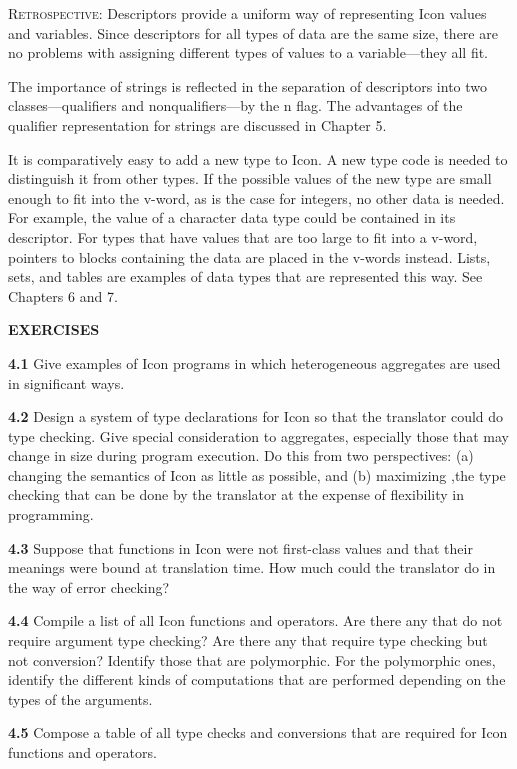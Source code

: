 \textsc{Retrospective}: Descriptors provide a uniform way of
representing Icon values and variables. Since descriptors for all
types of data are the same size, there are no problems with assigning
different types of values to a variable---they all fit.

The importance of strings is reflected in the separation of
descriptors into two classes---qualifiers and nonqualifiers---by the n
flag. The advantages of the qualifier representation for strings are
discussed in Chapter 5.

It is comparatively easy to add a new type to Icon. A new type code is
needed to distinguish it from other types. If the possible values of
the new type are small enough to fit into the v-word, as is the case
for integers, no other data is needed. For example, the value of a
character data type could be contained in its descriptor. For types
that have values that are too large to fit into a v-word, pointers to
blocks containing the data are placed in the v-words instead. Lists,
sets, and tables are examples of data types that are represented this
way. See Chapters 6 and 7.

\bigskip

\noindent\textbf{EXERCISES}

\noindent\textbf{4.1} Give examples of Icon programs in which
heterogeneous aggregates are used in significant ways.

\noindent\textbf{4.2} Design a system of type declarations for Icon so
that the translator could do type checking. Give special consideration
to aggregates, especially those that may change in size during program
execution. Do this from two perspectives: (a) changing the semantics
of Icon as little as possible, and (b) maximizing ,the type checking
that can be done by the translator at the expense of flexibility in
programming.

\noindent\textbf{4.3} Suppose that functions in Icon were not
first-class values and that their meanings were bound at translation
time. How much could the translator do in the way of error checking?

\noindent\textbf{4.4} Compile a list of all Icon functions and
operators. Are there any that do not require argument type checking?
Are there any that require type checking but not conversion? Identify
those that are polymorphic. For the polymorphic ones, identify the
different kinds of computations that are performed depending on the
types of the arguments.

\noindent\textbf{4.5} Compose a table of all type checks and
conversions that are required for Icon functions and operators.

